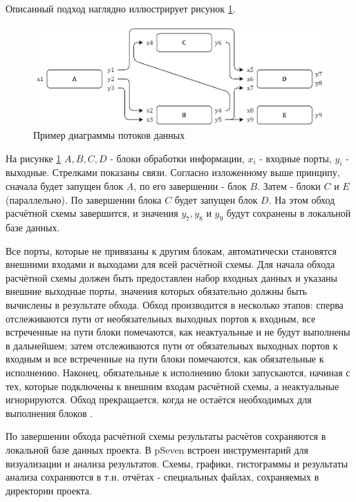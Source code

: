Описанный подход наглядно иллюстрирует рисунок \ref{fig:dataflow}.

\begin{figure}[!ht]
    \centering
    \includegraphics[width=\textwidth]{figures/dataflow.png}
    \caption{Пример диаграммы потоков данных}
    \label{fig:dataflow}
\end{figure}

На рисунке \ref{fig:dataflow} $A, B, C, D$ - блоки обработки информации, $x_i$ - входные порты, $y_i$ - выходные. Стрелками показаны связи. Согласно изложенному выше принципу, сначала будет запущен блок $A$, по его завершении - блок $B$. Затем - блоки $C$ и $E$ (параллельно). По завершении блока $C$ будет запущен блок $D$. На этом обход расчётной схемы завершится, и значения $y_7, y_8$ и $y_9$ будут сохранены в локальной базе данных.

\begin{remark}
Все порты, которые не привязаны к другим блокам, автоматически становятся внешними входами и выходами для всей расчётной схемы. Для начала обхода расчётной схемы должен быть предоставлен набор входных данных и указаны внешние выходные порты, значения которых обязательно должны быть вычислены в результате обхода. Обход производится в несколько этапов: сперва отслеживаются пути от необязательных выходных портов к входным, все встреченные на пути блоки помечаются, как неактуальные и не будут выполнены в дальнейшем; затем отслеживаются пути от обязательных выходных портов к входным и все встреченные на пути блоки помечаются, как обязательные к исполнению. Наконец, обязательные к исполнению блоки запускаются, начиная с тех, которые подключены к внешним входам расчётной схемы, а неактуальные игнорируются. Обход прекращается, когда не остаётся необходимых для выполнения блоков \cite{Nazarenko2015}. 
\end{remark}

По завершении обхода расчётной схемы результаты расчётов сохраняются в локальной базе данных проекта. В pSeven встроен инструментарий для визуализации и анализа результатов. Схемы, графики, гистограммы и результаты анализа сохраняются в т.н. отчётах - специальных файлах, сохраняемых в директории проекта.

